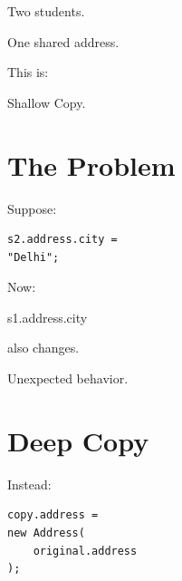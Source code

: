 \documentclass[11pt,a4paper]{book}
\begin{document}

Two students.


One shared address.


This is:


Shallow Copy.


\section{The Problem}

Suppose:

\begin{verbatim}
s2.address.city =
"Delhi";
\end{verbatim}


Now:


s1.address.city


also changes.


Unexpected behavior.


\section{Deep Copy}

Instead:

\begin{verbatim}
copy.address =
new Address(
    original.address
);
\end{verbatim}
\end{document}
